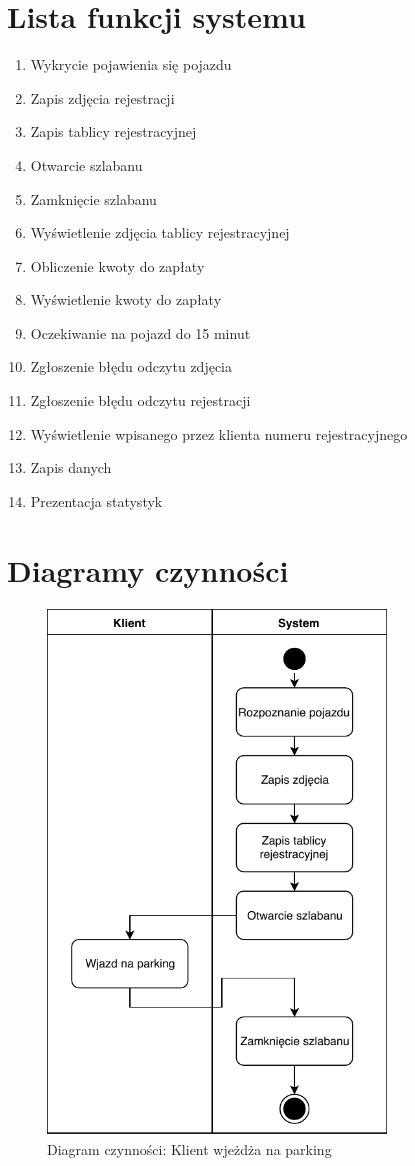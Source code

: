 \section{Lista funkcji systemu}


\begin{enumerate}
	\item Wykrycie pojawienia się pojazdu
	\item Zapis zdjęcia rejestracji
	\item Zapis tablicy rejestracyjnej
	\item Otwarcie szlabanu
	\item Zamknięcie szlabanu
	\item Wyświetlenie zdjęcia tablicy rejestracyjnej
	\item Obliczenie kwoty do zapłaty
	\item Wyświetlenie kwoty do zapłaty
	\item Oczekiwanie na pojazd do 15 minut
	\item Zgłoszenie błędu odczytu zdjęcia
	\item Zgłoszenie błędu odczytu rejestracji
	\item Wyświetlenie wpisanego przez klienta numeru rejestracyjnego
	\item Zapis danych
	\item Prezentacja statystyk
\end{enumerate}

\section{Diagramy czynności}

\begin{figure}[H]
	\centering
	\includegraphics[width=90mm]{diagramy/DiagCzynWjazd.pdf}
	\caption{Diagram czynności: Klient wjeżdża na parking}
\end{figure}


